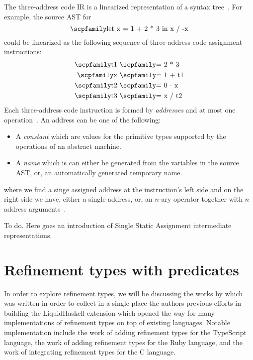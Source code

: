 \documentclass[
  oneside,
  english,
  coorientadorbanca,
  noabntexcite
]{ufsc-thesis-rn46-2019}
\newcommand{\code}[1]{\text{\scpfamily\setlength\spaceskip{0.35em}#1}}
\begin{document}
The three-address code IR is a linearized representation of a syntax tree~\cite{Aho:2006:CPT:1177220}.
For example, the source AST for
\begin{equation*}
  \code{let x = 1 + 2 * 3 in x / -x}
\end{equation*}
could be linearized as the following sequence of three-address code assignment instructions:
\begin{align*}
  \code{t1} \  & \code{= 2 * 3}  \\
  \code{x}  \  & \code{= 1 + t1} \\
  \code{t2} \  & \code{= 0 - x}  \\
  \code{t3} \  & \code{= x / t2}
\end{align*}
Each three-address code instruction is formed by \textit{addresses} and at most one operation~\cite{Aho:2006:CPT:1177220}.
An address can be one of the following:
\begin{itemize}
  \item A \textit{constant} \code{c} which are values for the primitive types supported by the operations of an abstract machine.

  \item A \textit{name} \code{n} which is can either be generated from the variables in the source AST, or, an automatically generated temporary name.
\end{itemize}

where we find a singe assigned address at the instruction's left side and on the right side we have, either a single address, or, an $n$-ary operator together with $n$ address arguments~\cite{Aho:2006:CPT:1177220}.

To do. Here goes an introduction of Single Static Assignment intermediate representations.

\chapter{Refinement types with predicates}\label{ch:refinement_types}

In order to explore refinement types, we will be discussing the works by \textcite{jhala2020tutorial} which was written in order to collect in a single place the authors previous efforts in \textcite{vazou2014liquidhaskell} building the LiquidHaskell extension  which opened the way for many implementations of refinement types on top of existing languages.
Notable implementation include the work of \textcite{vekris2016refinementtypescript} adding refinement types for the TypeScript language, the work of \textcite{vazou2018refinementruby} adding refinement types for the Ruby language, and the work of \textcite{sammler2021refinedc} integrating refinement types for the C language.
\end{document}
